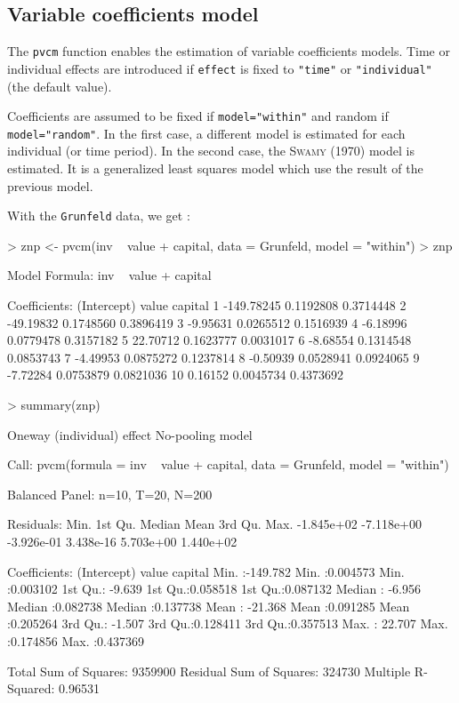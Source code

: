 \documentclass[a4paper]{article}
\begin{document}
\subsection{Variable coefficients model}

The \texttt{pvcm} function enables the estimation of variable
coefficients models. Time or individual effects are introduced if
\texttt{effect} is fixed to \texttt{"time"} or \texttt{"individual"}
(the default value). 

Coefficients are assumed to be fixed if \texttt{model="within"} and
random if \texttt{model="random"}. In the first case, a different
model is estimated for each individual (or time period). In the second
case, the \textsc{Swamy} (1970) model is estimated. It is a
generalized least squares model which use the result of the previous model.


With the \texttt{Grunfeld} data, we get :

\begin{Schunk}
\begin{Sinput}
> znp <- pvcm(inv ~ value + capital, data = Grunfeld, model = "within")
> znp
\end{Sinput}
\begin{Soutput}
Model Formula: inv ~ value + capital

Coefficients:
   (Intercept)     value   capital
1   -149.78245 0.1192808 0.3714448
2    -49.19832 0.1748560 0.3896419
3     -9.95631 0.0265512 0.1516939
4     -6.18996 0.0779478 0.3157182
5     22.70712 0.1623777 0.0031017
6     -8.68554 0.1314548 0.0853743
7     -4.49953 0.0875272 0.1237814
8     -0.50939 0.0528941 0.0924065
9     -7.72284 0.0753879 0.0821036
10     0.16152 0.0045734 0.4373692
\end{Soutput}
\begin{Sinput}
> summary(znp)
\end{Sinput}
\begin{Soutput}
Oneway (individual) effect No-pooling model

Call:
pvcm(formula = inv ~ value + capital, data = Grunfeld, model = "within")

Balanced Panel: n=10, T=20, N=200

Residuals:
      Min.    1st Qu.     Median       Mean    3rd Qu.       Max. 
-1.845e+02 -7.118e+00 -3.926e-01  3.438e-16  5.703e+00  1.440e+02 

Coefficients:
  (Intercept)           value             capital        
 Min.   :-149.782   Min.   :0.004573   Min.   :0.003102  
 1st Qu.:  -9.639   1st Qu.:0.058518   1st Qu.:0.087132  
 Median :  -6.956   Median :0.082738   Median :0.137738  
 Mean   : -21.368   Mean   :0.091285   Mean   :0.205264  
 3rd Qu.:  -1.507   3rd Qu.:0.128411   3rd Qu.:0.357513  
 Max.   :  22.707   Max.   :0.174856   Max.   :0.437369  

Total Sum of Squares: 9359900
Residual Sum of Squares: 324730
Multiple R-Squared: 0.96531
\end{Soutput}
\end{Schunk}
\end{document}
